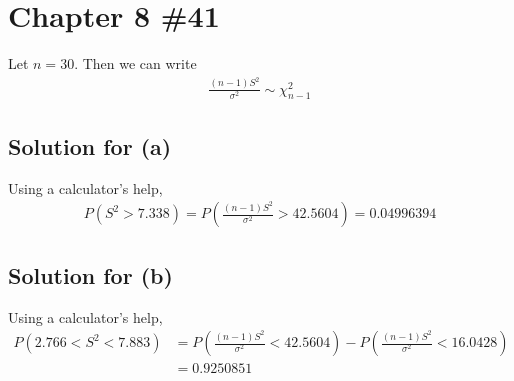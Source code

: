\documentclass{scrartcl}
\begin{document}
\section{Chapter 8 \#41}
Let \(n = 30\). Then we can write
\begin{align*}
  \frac{(n - 1)S^2}{\sigma^2} \sim \chi^2_{n - 1}
\end{align*}

\subsection{Solution for (a)}
Using a calculator's help,
\begin{align*}
  P(S^2 > 7.338)
  = P \left( \frac{(n - 1) S^2}{\sigma^2} > 42.5604 \right)
  = 0.04996394
\end{align*}

\subsection{Solution for (b)}
Using a calculator's help,
\begin{align*}
  P(2.766 < S^2 < 7.883)
  &= P \left( \frac{(n - 1) S^2}{\sigma^2} < 42.5604 \right)
    - P \left( \frac{(n - 1) S^2}{\sigma^2} < 16.0428 \right) \\
  &= 0.9250851
\end{align*}
\end{document}
